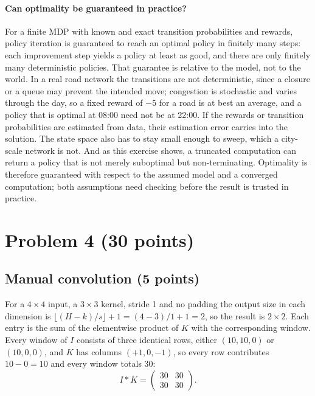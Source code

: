 \documentclass[11pt,a4paper]{article}
\begin{document}
\paragraph{Can optimality be guaranteed in practice?} For a finite MDP with known
and exact transition probabilities and rewards, policy iteration is guaranteed to
reach an optimal policy in finitely many steps: each improvement step yields a policy
at least as good, and there are only finitely many deterministic policies. That
guarantee is relative to the model, not to the world. In a real road network the
transitions are not deterministic, since a closure or a queue may prevent the
intended move; congestion is stochastic and varies through the day, so a fixed
reward of
$-5$ for a road is at best an average, and a policy that is optimal at 08:00 need not
be at 22:00. If the rewards or transition probabilities are estimated from data,
their estimation error carries into the solution. The state space also has to stay
small enough to sweep, which a city-scale network is not. And as this exercise shows,
a truncated computation can return a policy that is not merely suboptimal but
non-terminating. Optimality is therefore guaranteed with respect to the assumed model
and a converged computation; both assumptions need checking before the result is
trusted in practice.

\section{Problem 4 (30 points)}

\subsection{Manual convolution (5 points)}

For a $4\times4$ input, a $3\times3$ kernel, stride 1 and no padding the output size
in each dimension is $\lfloor (H-k)/s\rfloor+1=(4-3)/1+1=2$, so the result is
$2\times2$. Each entry is the sum of the elementwise product of $K$ with the
corresponding window. Every window of $I$ consists of three identical rows, either
$(10,10,0)$ or $(10,0,0)$, and $K$ has columns $(+1,0,-1)$, so every row contributes
$10-0=10$ and every window totals $30$:
\begin{equation}
I*K=\begin{pmatrix}30 & 30\\ 30 & 30\end{pmatrix}.
\end{equation}
\end{document}
